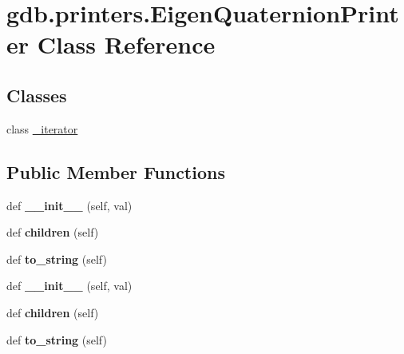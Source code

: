 \hypertarget{classgdb_1_1printers_1_1_eigen_quaternion_printer}{}\section{gdb.\+printers.\+Eigen\+Quaternion\+Printer Class Reference}
\label{classgdb_1_1printers_1_1_eigen_quaternion_printer}
\subsection*{Classes}
\begin{DoxyCompactItemize}
\item 
class \hyperlink{classgdb_1_1printers_1_1_eigen_quaternion_printer_1_1__iterator}{\+\_\+iterator}
\end{DoxyCompactItemize}
\subsection*{Public Member Functions}
\begin{DoxyCompactItemize}
\item 
\mbox{\label{classgdb_1_1printers_1_1_eigen_quaternion_printer_a0d7ce39ab1619e93ca5da9a2a6640147}} 
def {\bfseries \+\_\+\+\_\+init\+\_\+\+\_\+} (self, val)
\item 
\mbox{\label{classgdb_1_1printers_1_1_eigen_quaternion_printer_a7ab2dc7474b4712de01398ed8b90a7ec}} 
def {\bfseries children} (self)
\item 
\mbox{\label{classgdb_1_1printers_1_1_eigen_quaternion_printer_a3ca3c53cb6687ee53987509af35a35a9}} 
def {\bfseries to\+\_\+string} (self)
\item 
\mbox{\label{classgdb_1_1printers_1_1_eigen_quaternion_printer_a0d7ce39ab1619e93ca5da9a2a6640147}} 
def {\bfseries \+\_\+\+\_\+init\+\_\+\+\_\+} (self, val)
\item 
\mbox{\label{classgdb_1_1printers_1_1_eigen_quaternion_printer_a7ab2dc7474b4712de01398ed8b90a7ec}} 
def {\bfseries children} (self)
\item 
\mbox{\label{classgdb_1_1printers_1_1_eigen_quaternion_printer_a3ca3c53cb6687ee53987509af35a35a9}} 
def {\bfseries to\+\_\+string} (self)
\end{DoxyCompactItemize}
